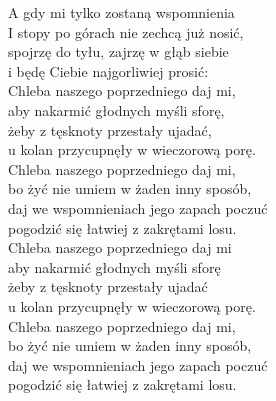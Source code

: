 
A gdy mi tylko zostaną wspomnienia \tab{} \\
I stopy po górach nie zechcą już nosić, \tab{} \\
spojrzę do tyłu, zajrzę w głąb siebie \tab{} \\
i będę Ciebie najgorliwiej prosić: \tab{} \\
\hops
Chleba naszego poprzedniego daj mi, \tab{} \\
aby nakarmić głodnych myśli sforę, \tab{} \\
żeby z tęsknoty przestały ujadać, \tab{} \\
u kolan przycupnęły w wieczorową porę. \tab{} \\
\hops
Chleba naszego poprzedniego daj mi,  \\
bo żyć nie umiem w żaden inny sposób,  \\
daj we wspomnieniach jego zapach poczuć  \\
pogodzić się łatwiej z zakrętami losu.  \\
\hops
Chleba naszego poprzedniego daj mi\\
aby nakarmić głodnych myśli sforę\\
żeby z tęsknoty przestały ujadać\\
u kolan przycupnęły w wieczorową porę.\\
\hops
Chleba naszego poprzedniego daj mi,  \\
bo żyć nie umiem w żaden inny sposób,  \\
daj we wspomnieniach jego zapach poczuć  \\
pogodzić się łatwiej z zakrętami losu.  \\